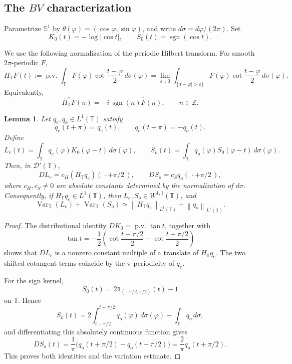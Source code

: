 \documentclass[11pt]{amsart}
\newtheorem{lemma}[definition]{Lemma}
\theoremstyle{remark}
\numberwithin{equation}{section}
\newcommand{\pv}{\operatorname{p.v.}}
\newcommand{\T}{\mathbb T}
\newcommand{\Sph}{\mathbb S^1}
\newcommand{\norm}[1]{\left\lVert #1\right\rVert}
\newcommand{\sgn}{\operatorname{sgn}}
\newcommand{\one}{\mathbf 1}
\newcommand{\Var}{\operatorname{Var}}
\begin{document}
	\subsection{The \texorpdfstring{\(BV\)}{BV} characterization}
	
	Parametrize \(\Sph\) by \(\theta(\varphi)=(\cos\varphi,\sin\varphi)\), and
	write \(d\sigma=d\varphi/(2\pi)\).
	Set
	\[
	K_0(t)=-\log|\cos t|,
	\qquad
	S_0(t)=\sgn(\cos t).
	\]
	
	We use the following normalization of the periodic Hilbert transform.  For
	smooth \(2\pi\)-periodic \(F\),
	\[
	H_\T F(t)
	:=
	\pv\int_\T F(\varphi)\cot\frac{t-\varphi}{2}\,d\sigma(\varphi)
	=
	\lim_{\varepsilon\downarrow0}
	\int_{\{|t-\varphi|>\varepsilon\}}
	F(\varphi)\cot\frac{t-\varphi}{2}\,d\sigma(\varphi).
	\]
	Equivalently,
	\[
	\widehat{H_\T F}(n)=-i\,\sgn(n)\widehat F(n),
	\qquad n\in\mathbb Z.
	\]
	
	\begin{lemma}\label{lem:profile-derivatives}
		Let \(q_e,q_o\in L^1(\T)\) satisfy
		\[
		q_e(t+\pi)=q_e(t),
		\qquad
		q_o(t+\pi)=-q_o(t).
		\]
		Define
		\[
		L_e(t)=\int_\T q_e(\varphi)K_0(\varphi-t)\,d\sigma(\varphi),
		\qquad
		S_o(t)=\int_\T q_o(\varphi)S_0(\varphi-t)\,d\sigma(\varphi).
		\]
		Then, in \(\mathcal D'(\T)\),
		\[
		DL_e=c_H(H_\T q_e)(\,\cdot+\pi/2\,),
		\qquad
		DS_o=c_S q_o(\,\cdot+\pi/2\,),
		\]
		where \(c_H,c_S\ne0\) are absolute constants determined by the normalization
		of \(d\sigma\).  Consequently, if \(H_\T q_e\in L^1(\T)\), then
		\(L_e,S_o\in W^{1,1}(\T)\), and
		\[
		\Var_\T(L_e)+\Var_\T(S_o)
		\simeq
		\norm{H_\T q_e}_{L^1(\T)}
		+
		\norm{q_o}_{L^1(\T)}.
		\]
	\end{lemma}
	
	\begin{proof}
		The distributional identity \(DK_0=\pv\tan t\), together with
		\[
		\tan t
		=
		-\frac12
		\left(
		\cot\frac{t-\pi/2}{2}
		+
		\cot\frac{t+\pi/2}{2}
		\right)
		\]
		shows that \(DL_e\) is a nonzero constant multiple of a translate of
		\(H_\T q_e\).  The two shifted cotangent terms coincide by the
		\(\pi\)-periodicity of \(q_e\).
		
		For the sign kernel,
		\[
		S_0(t)=2\one_{(-\pi/2,\pi/2)}(t)-1
		\]
		on \(\T\).  Hence
		\[
		S_o(t)=
		2\int_{t-\pi/2}^{t+\pi/2}q_o(\varphi)\,d\sigma(\varphi)
		-\int_\T q_o\,d\sigma,
		\]
		and differentiating this absolutely continuous function gives
		\[
		DS_o(t)
		=
		\frac1\pi
		\bigl(q_o(t+\pi/2)-q_o(t-\pi/2)\bigr)
		=
		\frac2\pi q_o(t+\pi/2).
		\]
		This proves both identities and the variation estimate.
	\end{proof}
	
\end{document}
